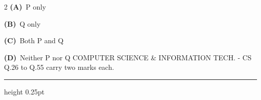 \documentclass[a4paper,10pt,twoside]{article}
\begin{document}
\begin{multicols}{2}
\textbf{(A)}~P only\par\vspace{2pt}\noindent
\textbf{(B)}~Q only\par\vspace{2pt}\noindent
\textbf{(C)}~Both P and Q\par\vspace{2pt}\noindent
\textbf{(D)}~Neither P nor Q  COMPUTER SCIENCE \& INFORMATION TECH. - CS \newline  \newline Q.26 to Q.55 carry two marks each.
\par\vspace{6pt}\hrule height 0.25pt\vspace{6pt}

\vspace{6pt}
\vspace{3pt}


\end{multicols}
\end{document}
